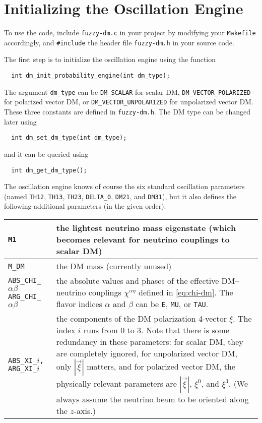 \documentclass{scrartcl}
\begin{document}
\section{Initializing the Oscillation Engine}

To use the code, include {\tt fuzzy-dm.c} in your project by modifying your
{\tt Makefile} accordingly, and {\tt \#include} the header file {\tt fuzzy-dm.h}
in your source code.

The first step is to initialize the oscillation engine using the function
\begin{verbatim}
  int dm_init_probability_engine(int dm_type);
\end{verbatim}
The argument {\tt dm_type} can be {\tt DM_SCALAR} for scalar DM,
{\tt DM_VECTOR_POLARIZED} for polarized vector DM, or
{\tt DM_VECTOR_UNPOLARIZED} for unpolarized vector DM.  These three
constants are defined in {\tt fuzzy-dm.h}.  The DM type can be
changed later using
\begin{verbatim}
  int dm_set_dm_type(int dm_type);
\end{verbatim}
and it can be queried using
\begin{verbatim}
  int dm_get_dm_type();
\end{verbatim}

The oscillation engine knows of course the six standard oscillation parameters
(named {\tt TH12}, {\tt TH13}, {\tt TH23}, {\tt DELTA_0}, {\tt DM21}, and
{\tt DM31}), but it also defines the following additional parameters
(in the given order):

\begin{table}[h]
\centering
\begin{tabular}{p{4.0cm}p{9.5cm}}
  \toprule
  \tt M1     & the lightest neutrino mass eigenstate (which becomes relevant
               for neutrino couplings to scalar DM) \\
  \midrule
  \tt M_DM   & the DM mass (currently unused) \\
  \midrule
  \tt ABS_CHI_$\alpha\beta$ \newline
      ARG_CHI_$\alpha\beta$
             & the absolute values and phases of the effective DM--neutrino
               couplings $\chi^{\alpha\eta}$ defined in \cref{eq:chi-dm}. The flavor
               indices $\alpha$ and $\beta$ can be {\tt E}, {\tt MU}, or
               {\tt TAU}.\\
  \midrule
  \tt ABS_XI_$i$, ARG_XI_$i$
             & the components of the DM polarization 4-vector $\xi$. The index
               $i$ runs from 0 to 3. Note that there is some redundancy in these
               parameters: for scalar DM, they are completely ignored, for
               unpolarized vector DM, only $|\vec\xi|$ matters, and for
               polarized vector DM, the physically relevant parameters
               are $|\vec\xi|$, $\xi^0$, and $\xi^3$. (We always assume the
               neutrino beam to be oriented along the $z$-axis.) \\
  \bottomrule
\end{tabular}
\end{table}
\end{document}
